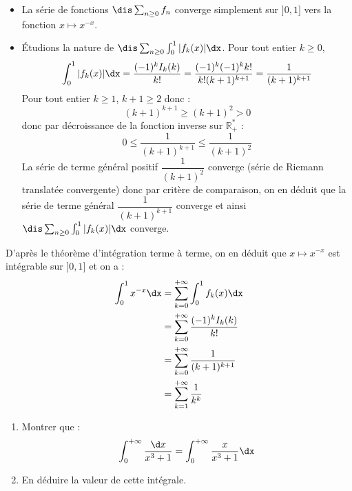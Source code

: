 \documentclass[a4paper,10pt]{report}
\begin{document}
\begin{enumerate}
\begin{itemize}
\item La série de fonctions $\dis \sum_{n \geq 0} f_n$ converge simplement sur $]0,1]$ vers la fonction $x \mapsto x^{-x}$.
\item Étudions la nature de $\dis \sum_{n \geq 0} \int_0^1 \vert f_k(x) \vert\dx$. Pour tout entier $k \geq 0$,
$$ \int_0^1 \vert f_k(x) \vert\dx = \dfrac{(-1)^k I_k(k)}{k!} = \dfrac{(-1)^k(-1)^k k!}{k! (k+1)^{k+1}} = \dfrac{1}{(k+1)^{k+1}}$$
Pour tout entier $k \geq 1$, $k+1 \geq 2$ donc : 
$$ (k+1)^{k+1} \geq (k+1)^2 >0$$
donc par décroissance de la fonction inverse sur $\mathbb{R}_+^{*}$ :
$$ 0 \leq \dfrac{1}{(k+1)^{k+1}} \leq \dfrac{1}{(k+1)^2}$$
La série de terme général positif $\dfrac{1}{(k+1)^2}$ converge (série de Riemann translatée convergente) donc par critère de comparaison, on en déduit que la série de terme général $\dfrac{1}{(k+1)^{k+1}}$ converge et ainsi $\dis \sum_{n \geq 0} \int_0^1 \vert f_k(x) \vert\dx$ converge.
\end{itemize}
D'après le théorème d'intégration terme à terme, on en déduit que $x \mapsto x^{-x}$ est intégrable sur $]0,1]$ et on a :
\begin{align*}
\int_0^1 x^{-x} \dx & = \sum_{k=0}^{+ \infty} \int_0^1 f_k(x) \dx \\
& = \sum_{k=0}^{+ \infty} \dfrac{(-1)^k I_k(k)}{k!} \\
& = \sum_{k=0}^{+ \infty} \dfrac{1}{(k+1)^{k+1}} \\
& = \sum_{k=1}^{+ \infty} \dfrac{1}{k^k}
\end{align*}
\end{enumerate}

\begin{Exa}
\begin{enumerate}
  \item
    Montrer que :
    \[
\int_{0}^{ + \infty} \frac{\d x}{x^{3} + 1} = \int_{0}^{ + \infty} \frac{x}{x^{3} + 1}\dx
    \]
  \item
    En déduire la valeur de cette intégrale.
  \end{enumerate}
\end{Exa} 

\corr 
\end{document}
